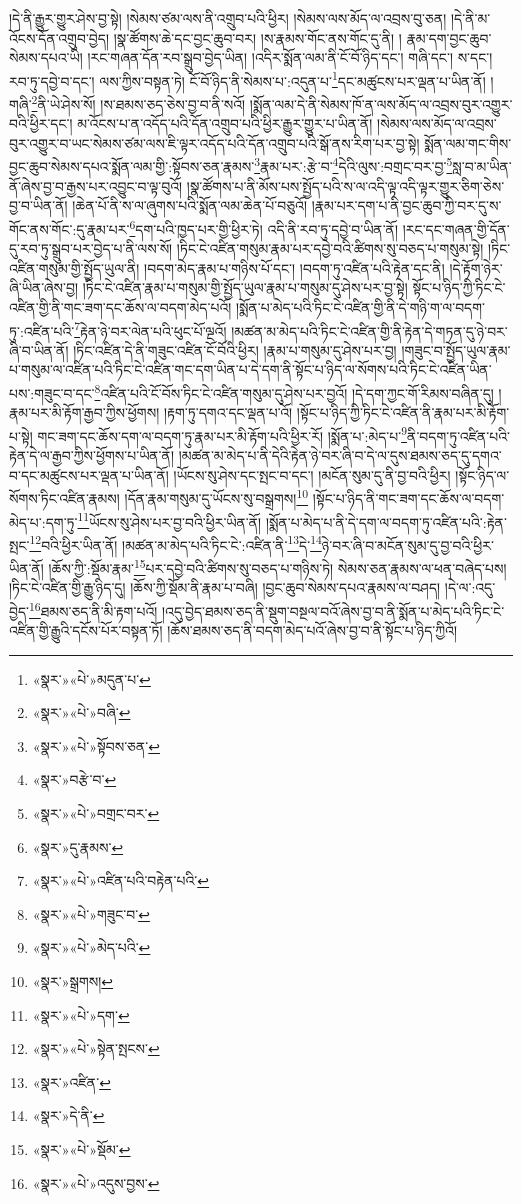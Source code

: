 །དེ་ནི་རྒྱུར་གྱུར་ཤེས་བྱ་སྟེ། །སེམས་ཙམ་ལས་ནི་འགྲུབ་པའི་ཕྱིར། །སེམས་ལས་མོད་ལ་འབྲས་བུ་ཅན། །དེ་ནི་མ་འོངས་དོན་འགྲུབ་བྱེད། །སྣ་ཚོགས་ཆེ་དང་བྱང་ཆུབ་བར། །ས་རྣམས་གོང་ནས་གོང་དུ་ནི། །
རྣམ་དག་བྱང་ཆུབ་སེམས་དཔའ་ཡི། །རང་གཞན་དོན་རབ་སྒྲུབ་བྱེད་ཡིན། །འདིར་སྨོན་ལམ་ནི་ངོ་བོ་ཉིད་དང་། གཞི་དང་། ས་དང་། རབ་ཏུ་དབྱེ་བ་དང་། ལས་ཀྱིས་བསྟན་ཏེ། ངོ་བོ་ཉིད་ནི་སེམས་པ་:འདུན་པ་\footnote{«སྣར་»«པེ་»མདུན་པ་}དང་མཚུངས་པར་ལྡན་པ་ཡིན་ནོ། །གཞི་\footnote{«སྣར་»«པེ་»བཞི་}ནི་ཡེ་ཤེས་སོ། །ས་ཐམས་ཅད་ཅེས་བྱ་བ་ནི་སའོ། །སྨོན་ལམ་དེ་ནི་སེམས་ཁོ་ན་ལས་མོད་ལ་འབྲས་བུར་འགྱུར་བའི་ཕྱིར་དང་། མ་འོངས་པ་ན་འདོད་པའི་དོན་འགྲུབ་པའི་ཕྱིར་རྒྱུར་གྱུར་པ་ཡིན་ནོ། །སེམས་ལས་མོད་ལ་འབྲས་བུར་འགྱུར་བ་ཡང་སེམས་ཙམ་ལས་ཇི་ལྟར་འདོད་པའི་དོན་འགྲུབ་པའི་སྒོ་ནས་རིག་པར་བྱ་སྟེ། སྨོན་ལམ་གང་གིས་བྱང་ཆུབ་སེམས་དཔའ་སྨོན་ལམ་གྱི་:སྟོབས་ཅན་རྣམས་\footnote{«སྣར་»«པེ་»སྟོབས་ཅན་}རྣམ་པར་:རྩེ་བ་\footnote{«སྣར་»བརྩེ་བ་}དེའི་ལུས་:བགྲང་བར་བྱ་\footnote{«སྣར་»«པེ་»བགྲང་བར་}སླ་བ་མ་ཡིན་ནོ་ཞེས་བྱ་བ་རྒྱས་པར་འབྱུང་བ་ལྟ་བུའོ། །སྣ་ཚོགས་པ་ནི་མོས་པས་སྤྱོད་པའི་ས་ལ་འདི་ལྟ་འདི་ལྟར་གྱུར་ཅིག་ཅེས་བྱ་བ་ཡིན་ནོ། །ཆེན་པོ་ནི་ས་ལ་ཞུགས་པའི་སྨོན་ལམ་ཆེན་པོ་བཅུའོ། །རྣམ་པར་དག་པ་ནི་བྱང་ཆུབ་ཀྱི་བར་དུ་ས་གོང་ནས་གོང་:དུ་རྣམ་པར་\footnote{«སྣར་»དུ་རྣམས་}དག་པའི་ཁྱད་པར་གྱི་ཕྱིར་ཏེ། འདི་ནི་རབ་ཏུ་དབྱེ་བ་ཡིན་ནོ། །རང་དང་གཞན་གྱི་དོན་དུ་རབ་ཏུ་སྒྲུབ་པར་བྱེད་པ་ནི་ལས་སོ། །ཏིང་ངེ་འཛིན་གསུམ་རྣམ་པར་དབྱེ་བའི་ཚིགས་སུ་བཅད་པ་གསུམ་སྟེ། །ཏིང་འཛིན་གསུམ་གྱི་སྤྱོད་ཡུལ་ནི། །བདག་མེད་རྣམ་པ་གཉིས་པོ་དང་། །བདག་ཏུ་འཛིན་པའི་རྟེན་དང་ནི། །དེ་རྟོག་ཉེར་ཞི་ཡིན་ཞེས་བྱ། །ཏིང་ངེ་འཛིན་རྣམ་པ་གསུམ་གྱི་སྤྱོད་ཡུལ་རྣམ་པ་གསུམ་དུ་ཤེས་པར་བྱ་སྟེ། སྟོང་པ་ཉིད་ཀྱི་ཏིང་ངེ་འཛིན་གྱི་ནི་གང་ཟག་དང་ཆོས་ལ་བདག་མེད་པའོ། །སྨོན་པ་མེད་པའི་ཏིང་ངེ་འཛིན་གྱི་ནི་དེ་གཉི་ག་ལ་བདག་ཏུ་:འཛིན་པའི་\footnote{«སྣར་»«པེ་»འཛིན་པའི་བརྟེན་པའི་}རྟེན་ཉེ་བར་ལེན་པའི་ཕུང་པོ་ལྔའོ། །མཚན་མ་མེད་པའི་ཏིང་ངེ་འཛིན་གྱི་ནི་རྟེན་དེ་གཏན་དུ་ཉེ་བར་ཞི་བ་ཡིན་ནོ། །ཏིང་འཛིན་དེ་ནི་གཟུང་འཛིན་ངོ་བོའི་ཕྱིར། །རྣམ་པ་གསུམ་དུ་ཤེས་པར་བྱ། །གཟུང་བ་སྤྱོད་ཡུལ་རྣམ་པ་གསུམ་ལ་འཛིན་པའི་ཏིང་ངེ་འཛིན་གང་དག་ཡིན་པ་དེ་དག་ནི་སྟོང་པ་ཉིད་ལ་སོགས་པའི་ཏིང་ངེ་འཛིན་ཡིན་པས་:གཟུང་བ་དང་\footnote{«སྣར་»«པེ་»གཟུང་བ་}འཛིན་པའི་ངོ་བོས་ཏིང་ངེ་འཛིན་གསུམ་དུ་ཤེས་པར་བྱའོ། །དེ་དག་ཀྱང་གོ་རིམས་བཞིན་དུ། །རྣམ་པར་མི་རྟོག་རྒྱབ་ཀྱིས་ཕྱོགས། །རྟག་ཏུ་དགའ་དང་ལྡན་པ་འོ། །སྟོང་པ་ཉིད་ཀྱི་ཏིང་ངེ་འཛིན་ནི་རྣམ་པར་མི་རྟོག་པ་སྟེ། གང་ཟག་དང་ཆོས་དག་ལ་བདག་ཏུ་རྣམ་པར་མི་རྟོག་པའི་ཕྱིར་རོ། །སྨོན་པ་:མེད་པ་\footnote{«སྣར་»«པེ་»མེད་པའི་}ནི་བདག་ཏུ་འཛིན་པའི་རྟེན་དེ་ལ་རྒྱབ་ཀྱིས་ཕྱོགས་པ་ཡིན་ནོ། །མཚན་མ་མེད་པ་ནི་དེའི་རྟེན་ཉེ་བར་ཞི་བ་དེ་ལ་དུས་ཐམས་ཅད་དུ་དགའ་བ་དང་མཚུངས་པར་ལྡན་པ་ཡིན་ནོ། །ཡོངས་སུ་ཤེས་དང་སྤང་བ་དང་། །མངོན་སུམ་དུ་ནི་བྱ་བའི་ཕྱིར། །སྟོང་ཉིད་ལ་སོགས་ཏིང་འཛིན་རྣམས། །དོན་རྣམ་གསུམ་དུ་ཡོངས་སུ་བསྒྲགས།\footnote{«སྣར་»སྒྲགས།} །སྟོང་པ་ཉིད་ནི་གང་ཟག་དང་ཆོས་ལ་བདག་མེད་པ་:དག་ཏུ་\footnote{«སྣར་»«པེ་»དག་}ཡོངས་སུ་ཤེས་པར་བྱ་བའི་ཕྱིར་ཡིན་ནོ། །སྨོན་པ་མེད་པ་ནི་དེ་དག་ལ་བདག་ཏུ་འཛིན་པའི་:རྟེན་སྤང་\footnote{«སྣར་»«པེ་»སྟེན་སྤངས་}བའི་ཕྱིར་ཡིན་ནོ། །མཚན་མ་མེད་པའི་ཏིང་ངེ་:འཛིན་ནི་\footnote{«སྣར་»འཛིན་}དེ་\footnote{«སྣར་»དེ་ནི་}ཉེ་བར་ཞི་བ་མངོན་སུམ་དུ་བྱ་བའི་ཕྱིར་ཡིན་ནོ། །ཆོས་ཀྱི་:སྡོམ་རྣམ་\footnote{«སྣར་»«པེ་»སྡོམ་}པར་དབྱེ་བའི་ཚིགས་སུ་བཅད་པ་གཉིས་ཏེ། སེམས་ཅན་རྣམས་ལ་ཕན་བཞེད་པས། །ཏིང་ངེ་འཛིན་གྱི་རྒྱུ་ཉིད་དུ། །ཆོས་ཀྱི་སྡོམ་ནི་རྣམ་པ་བཞི། །བྱང་ཆུབ་སེམས་དཔའ་རྣམས་ལ་བཤད། །དེ་ལ་:འདུ་བྱེད་\footnote{«སྣར་»«པེ་»འདུས་བྱས་}ཐམས་ཅད་ནི་མི་རྟག་པའོ། །འདུ་བྱེད་ཐམས་ཅད་ནི་སྡུག་བསྔལ་བའོ་ཞེས་བྱ་བ་ནི་སྨོན་པ་མེད་པའི་ཏིང་ངེ་འཛིན་གྱི་རྒྱུའི་དངོས་པོར་བསྟན་ཏོ། །ཆོས་ཐམས་ཅད་ནི་བདག་མེད་པའོ་ཞེས་བྱ་བ་ནི་སྟོང་པ་ཉིད་ཀྱིའོ། 